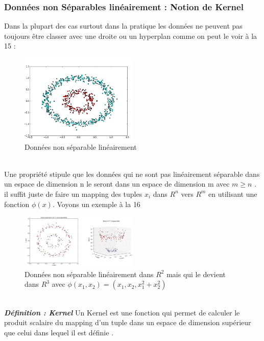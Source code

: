 \subsubsection{Données non Séparables linéairement : Notion de Kernel  \cite{SVm2}}
Dans la plupart des cas surtout dans la pratique les données ne peuvent pas toujours être classer avec une droite ou un hyperplan comme on peut le voir à la \figurename{15} :
 \begin{figure}[ht]
 	\centering
 	\includegraphics[width=0.5\textwidth]{fig/NonLinearDecisionBoudary.png}
 	\caption{Données non séparable linéairement  }
 	\label{fig:image15}
 \end{figure}\\
 Une propriété stipule que les données qui ne sont pas linéairement séparable dans un espace de dimension n le seront dans un espace de dimension m avec $m \ge n$ \cite{8}. il suffit juste de faire un mapping des tuples ${x}_{i}$  dans ${R}^{n}$ vers ${R}^{m}$ en utilisant une fonction $\phi(x)$. Voyons un exemple à la \figurename{16}\\
  \begin{figure}[ht]
  	\centering
  	\includegraphics[width=0.5\textwidth]{fig/NonLinearDecisionBoudary2.png}
  	\caption{Données non séparable linéairement dans ${R}^{2}$ mais qui le devient dans ${R}^{3}$ avec $\phi({x}_{1},{x}_{2} ) = ({x}_{1},{x}_{2},{x}^{2}_{1}+{x}^{2}_{2})$ }
  	\label{fig:image16}
  \end{figure}\\
 \emph{\textbf{Définition  : Kernel}}
 Un Kernel est une fonction qui permet de calculer le produit scalaire du mapping d'un tuple dans un espace de dimension supérieur que celui dans lequel il est définie .
